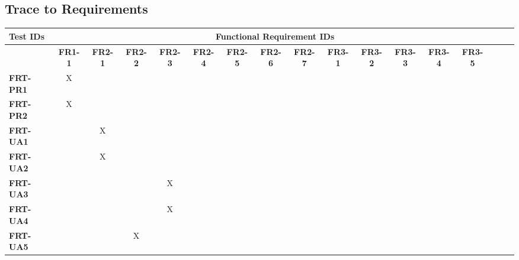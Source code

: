 \documentclass[12pt, titlepage]{article}
\begin{document}
\newpage
\begin{landscape}
\section{Trace to Requirements}

\footnotesize
\begin{longtable}{|l|cccccccccccccccc|}
  \hline
  \textbf{Test IDs} & \multicolumn{14}{c|}{\textbf{Functional Requirement IDs}} \\
  \hline
  ~                 & \textbf{FR1-1} & \textbf{FR2-1} & \textbf{FR2-2} & \textbf{FR2-3} & \textbf{FR2-4} & \textbf{FR2-5} & \textbf{FR2-6} & \textbf{FR2-7} & \textbf{FR3-1} & \textbf{FR3-2} & \textbf{FR3-3} & \textbf{FR3-4} & \textbf{FR3-5} \\
  \hline
  \textbf{FRT-PR1}  & X              & ~              & ~              & ~              & ~              & ~              & ~              & ~              & ~              & ~              & ~              & ~              & ~              \\
  \textbf{FRT-PR2}  & X              & ~              & ~              & ~              & ~              & ~              & ~              & ~              & ~              & ~              & ~              & ~              & ~              \\
  \textbf{FRT-UA1}  & ~              & X              & ~              & ~              & ~              & ~              & ~              & ~              & ~              & ~              & ~              & ~              & ~              \\
  \textbf{FRT-UA2}  & ~              & X              & ~              & ~              & ~              & ~              & ~              & ~              & ~              & ~              & ~              & ~              & ~              \\
  \textbf{FRT-UA3}  & ~              & ~              & ~              & X              & ~              & ~              & ~              & ~              & ~              & ~              & ~              & ~              & ~              \\
  \textbf{FRT-UA4}  & ~              & ~              & ~              & X              & ~              & ~              & ~              & ~              & ~              & ~              & ~              & ~              & ~              \\
  \textbf{FRT-UA5}  & ~              & ~              & X              & ~              & ~              & ~              & ~              & ~              & ~              & ~              & ~              & ~              & ~              \\

\end{longtable}
\end{landscape}
\end{document}
